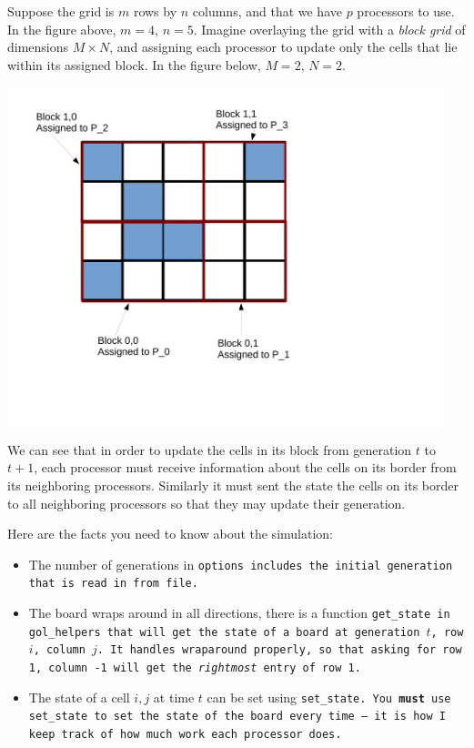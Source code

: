 \documentclass{article}
\begin{document}
\begin{enumerate}
Suppose the grid is $m$ rows by $n$ columns, and that we have $p$
processors to use.  In the figure above, $m=4$, $n=5$.  Imagine
overlaying the grid with a \textit{block grid} of dimensions $M \times
N$, and assigning each processor to update only the cells that lie
within its assigned block.  In the figure below, $M=2$, $N=2$. 
\begin{center}
\includegraphics[trim={1.5cm 3.5cm 8cm 1.5cm},clip,width=5in]{figs/gol_1_block.pdf}
\end{center}

We can see that in order to update the cells in its block from
generation $t$ to $t+1$, each processor must receive information about
the cells on its border from its neighboring processors.  Similarly it
must sent the state the cells on its border to all neighboring
processors so that they may update their generation.  

Here are the facts you need to know about the simulation:
\begin{itemize}
\item The number of generations in \tt{options} includes the initial
  generation that is read in from file. 
\item The board wraps around in all directions, there is a function
  \tt{get\_state} in \tt{gol\_helpers} that will get the state of a
  board at generation $t$, row $i$, column $j$.  It handles wraparound
  properly, so that asking for row 1, column -1 will get the
  \textit{rightmost} entry of row 1.

\item The state of a cell $i,j$ at time $t$ can be set using
  \tt{set\_state}.  You \textbf{must} use \tt{set\_state} to set the
  state of the board every time -- it is how I keep track of how much
  work each processor does.  


\end{itemize}
\end{enumerate}
\end{document}
